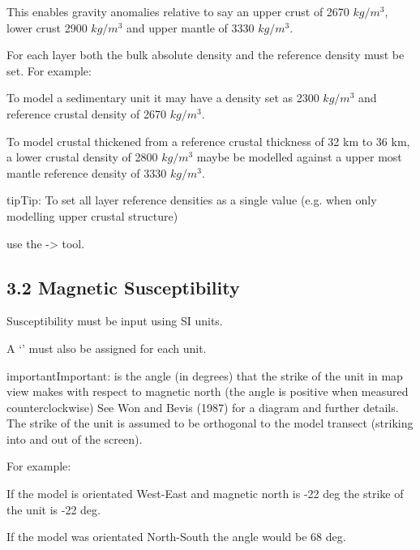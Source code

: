 \documentclass[a4paper,12pt,english]{sphinxmanual}
\begin{document}
This enables gravity anomalies relative to say an upper crust of 2670 \(kg/m^3\), lower crust 2900 \(kg/m^3\)
and upper mantle of 3330 \(kg/m^3\).

For each layer both the bulk absolute density and the reference density must be set. For example:

To model a sedimentary unit it may have a density set as 2300 \(kg/m^3\) and reference crustal
density of 2670 \(kg/m^3\).

To model crustal thickened from a reference crustal thickness of 32 km to 36 km, a lower crustal density of
2800 \(kg/m^3\) maybe be modelled against a upper most mantle reference density of 3330 \(kg/m^3\).

\begin{sphinxadmonition}{tip}{Tip:}
To set all layer reference densities as a single value (e.g. when only modelling upper crustal structure)
\end{sphinxadmonition}

use the  -\textgreater{}  tool.

\begin{DUlineblock}{0em}
\item[] 
\end{DUlineblock}


\subsection{3.2 Magnetic Susceptibility}
\label{\detokenize{manual__layer_attributes:magnetic-susceptibility}}
Susceptibility must be input using SI units.

A ‘’ must also be assigned for each unit.

\begin{sphinxadmonition}{important}{Important:}
 is the angle (in degrees) that the strike of the unit in map view makes with respect to magnetic north
(the angle is positive when measured counterclockwise) See Won and Bevis (1987) for a diagram and further details.
The strike of the unit is assumed to be orthogonal to the model transect (striking into and out of the screen).

For example:

If the model is orientated West-East and magnetic north is -22 deg the strike of the unit is -22 deg.

If the model was orientated North-South the angle would be 68 deg.
\end{sphinxadmonition}
\end{document}
